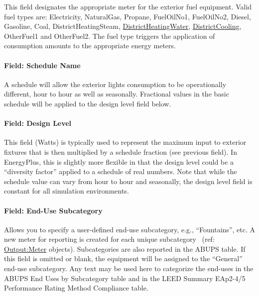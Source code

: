 This field designates the appropriate meter for the exterior fuel equipment. Valid fuel types are: Electricity, NaturalGas, Propane, FuelOilNo1, FuelOilNo2, Diesel, Gasoline, Coal, DistrictHeatingSteam, \hyperref[districtheating]{DistrictHeatingWater}, \hyperref[districtcooling]{DistrictCooling}, OtherFuel1 and OtherFuel2. The fuel type triggers the application of consumption amounts to the appropriate energy meters.

\paragraph{Field: Schedule Name}\label{field-schedule-name-1-000}

A schedule will allow the exterior lights consumption to be operationally different, hour to hour as well as seasonally. Fractional values in the basic schedule will be applied to the design level field below.

\paragraph{Field: Design Level}\label{field-design-level-1}

This field (Watts) is typically used to represent the maximum input to exterior fixtures that is then multiplied by a schedule fraction (see previous field). In EnergyPlus, this is slightly more flexible in that the design level could be a ``diversity factor'' applied to a schedule of real numbers. Note that while the schedule value can vary from hour to hour and seasonally, the design level field is constant for all simulation environments.

\paragraph{Field: End-Use Subcategory}\label{field-end-use-subcategory-1}

Allows you to specify a user-defined end-use subcategory, e.g., ``Fountains'', etc. A new meter for reporting is created for each unique subcategory~ (ref: \hyperref[outputmeter-and-outputmetermeterfileonly]{Output:Meter} objects). Subcategories are also reported in the ABUPS table. If this field is omitted or blank, the equipment will be assigned to the ``General'' end-use subcategory. Any text may be used here to categorize the end-uses in the ABUPS End Uses by Subcategory table and in the LEED Summary EAp2-4/5 Performance Rating Method Compliance table.

